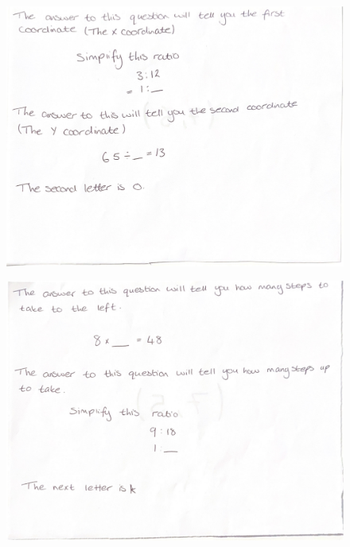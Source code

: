 \documentclass[11pt, a4paper, notitlepage]{article}
\begin{document}
\begin{figure}[h]
    \centering
    \includegraphics[width=\textwidth]{Images/CoordinateGrid_questions-pages-5.pdf}
\end{figure}
\begin{figure}[h]
    \centering
    \includegraphics[width=\textwidth]{Images/CoordinateGrid_questions-pages-6.pdf}
\end{figure}
\end{document}
